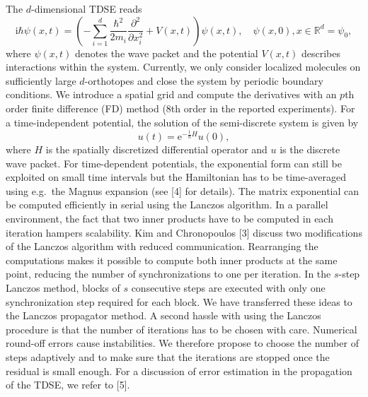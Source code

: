 \documentclass{report}
\begin{document}
The $d$-dimensional TDSE reads
\begin{equation*}
\mathrm{i}\hbar \psi(x,t) = \left(-
\sum_{i=1}^d\frac{\hbar^2}{2m_i}\frac{\partial^2}{\partial x_i^2} +
V(x,t)\right)\psi(x,t), \quad \psi(x,0), x \in \mathbb{R}^d = \psi_0,
\end{equation*}
where $\psi(x,t)$ denotes the wave packet and the potential $V(x,t)$
describes interactions within the system. Currently, we only consider
localized molecules on sufficiently large $d$-orthotopes and close the
system by periodic boundary conditions. We introduce a spatial grid and
compute the derivatives with an $p$th order finite difference (FD) method
(8th order in the reported experiments). For a time-independent
potential, the solution of the semi-discrete system is given by
\begin{equation*}
u(t) = \mathrm{e}^{-\frac{\mathrm{i}}{\hbar} H}u(0),
\end{equation*}
where $H$ is the spatially discretized differential operator and $u$ is
the discrete wave packet. For time-dependent potentials, the exponential
form can still be exploited on small time intervals but the Hamiltonian
has to be time-averaged using e.g.~the Magnus expansion (see [4] for
details). The matrix exponential can be computed efficiently in serial
using the Lanczos algorithm. In a parallel environment, the fact that two
inner products have to be computed in each iteration hampers scalability.
Kim and Chronopoulos [3] discuss two modifications of the Lanczos
algorithm with reduced communication. Rearranging the computations makes
it possible to compute both inner products at the same point, reducing
the number of synchronizations to one per iteration. In the $s$-step
Lanczos method, blocks of $s$ consecutive steps are executed with only
one synchronization step required for each block. We have transferred
these ideas to the Lanczos propagator method. A second hassle with using
the Lanczos procedure is that the number of iterations has to be chosen
with care. Numerical round-off errors cause instabilities. We therefore
propose to choose the number of steps adaptively and to make sure that
the iterations are stopped once the residual is small enough. For a
discussion of error estimation in the propagation of the TDSE, we refer
to [5].
\end{document}
